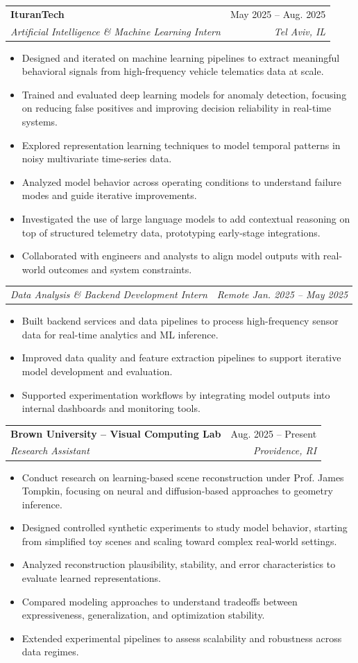 \documentclass[letterpaper,11pt]{article}
\makeatletter
\newcommand{\resumeItem}[1]{
  \item\small{{#1 \vspace{-4pt}}}
}
\newcommand{\resumeSubheading}[4]{
  \vspace{-2pt}\item
    \begin{tabular*}{0.97\textwidth}[t]{l@{\extracolsep{\fill}}r}
      \textbf{#1} & #2 \\
      \textit{\small#3} & \textit{\small #4} \\
    \end{tabular*}\vspace{-7pt}
}
\newcommand{\resumeSubSubheading}[2]{
  \item
  \begin{tabular*}{0.97\textwidth}{l@{\extracolsep{\fill}}r}
    \textit{\small#1} & \textit{\small #2} \\
  \end{tabular*}\vspace{-7pt}
}
\newcommand{\resumeItemListStart}{\begin{itemize}}
\newcommand{\resumeItemListEnd}{\end{itemize}\vspace{-5pt}}
\makeatother
\begin{document}
\resumeSubheading
  {IturanTech}{May 2025 -- Aug. 2025}
  {Artificial Intelligence \& Machine Learning Intern}{Tel Aviv, IL}
  \resumeItemListStart
    \resumeItem{Designed and iterated on machine learning pipelines to extract meaningful behavioral signals from high-frequency vehicle telematics data at scale.}
    \resumeItem{Trained and evaluated deep learning models for anomaly detection, focusing on reducing false positives and improving decision reliability in real-time systems.}
    \resumeItem{Explored representation learning techniques to model temporal patterns in noisy multivariate time-series data.}
    \resumeItem{Analyzed model behavior across operating conditions to understand failure modes and guide iterative improvements.}
    \resumeItem{Investigated the use of large language models to add contextual reasoning on top of structured telemetry data, prototyping early-stage integrations.}
    \resumeItem{Collaborated with engineers and analysts to align model outputs with real-world outcomes and system constraints.}
  \resumeItemListEnd

\resumeSubSubheading
  {Data Analysis \& Backend Development Intern}{Remote \hspace{1em} Jan. 2025 -- May 2025}
  \resumeItemListStart
    \resumeItem{Built backend services and data pipelines to process high-frequency sensor data for real-time analytics and ML inference.}
    \resumeItem{Improved data quality and feature extraction pipelines to support iterative model development and evaluation.}
    \resumeItem{Supported experimentation workflows by integrating model outputs into internal dashboards and monitoring tools.}
  \resumeItemListEnd

\resumeSubheading
  {Brown University -- Visual Computing Lab}{Aug. 2025 -- Present}
  {Research Assistant}{Providence, RI}
  \resumeItemListStart
    \resumeItem{Conduct research on learning-based scene reconstruction under Prof. James Tompkin, focusing on neural and diffusion-based approaches to geometry inference.}
    \resumeItem{Designed controlled synthetic experiments to study model behavior, starting from simplified toy scenes and scaling toward complex real-world settings.}
    \resumeItem{Analyzed reconstruction plausibility, stability, and error characteristics to evaluate learned representations.}
    \resumeItem{Compared modeling approaches to understand tradeoffs between expressiveness, generalization, and optimization stability.}
    \resumeItem{Extended experimental pipelines to assess scalability and robustness across data regimes.}
  \resumeItemListEnd
\end{document}
